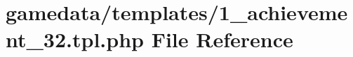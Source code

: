 \hypertarget{1__achievement__32_8tpl_8php}{\section{gamedata/templates/1\+\_\+achievement\+\_\+32.tpl.\+php File Reference}
\label{1__achievement__32_8tpl_8php}
}
